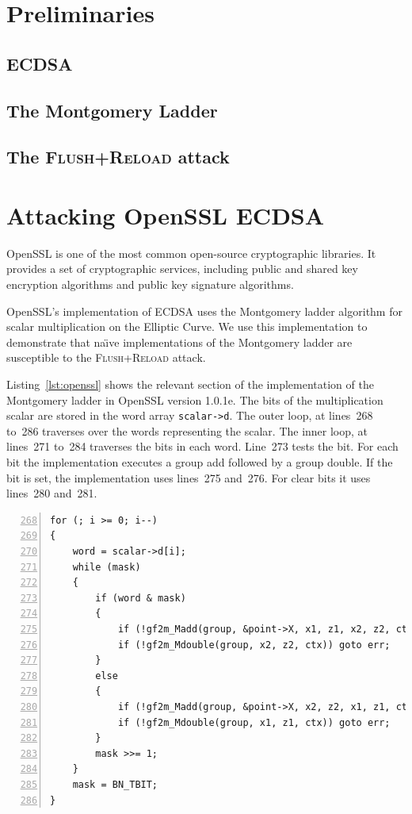 \documentclass{llncs}
\begin{document}
\section{Preliminaries}
\subsection{ECDSA}
\subsection{The Montgomery Ladder}
\subsection{The \textsc{Flush+Reload} attack}
\section{Attacking OpenSSL ECDSA}
OpenSSL is one of the most common open-source cryptographic libraries.
It provides a set of cryptographic services, including public and shared key encryption 
algorithms and public key signature algorithms.

OpenSSL's implementation of ECDSA uses the Montgomery ladder algorithm for scalar multiplication
on the Elliptic Curve.
We use this implementation to demonstrate that na{\"\i}ve implementations of the Montgomery ladder are
susceptible to the \textsc{Flush+Reload} attack.

Listing~\ref{lst:openssl} shows the relevant section of the implementation of the Montgomery ladder in OpenSSL version 1.0.1e.
The bits of the multiplication scalar are stored in the word array \texttt{scalar->d}.
The outer loop, at lines~268 to~286 traverses over the words representing the scalar.
The inner loop, at lines~271 to~284 traverses the bits in each word.
Line~273 tests the bit. 
For each bit the implementation executes a group add followed by a group double.
If the bit is set, the implementation uses lines~275 and~276.
For clear bits it uses lines~280 and~281.

\begin{lstlisting}[numbers=left,firstnumber=268,float=htb,caption=OpenSSL Implementation of the Montgomery Ladder,label=lst:openssl]
for (; i >= 0; i--)
{
    word = scalar->d[i];
    while (mask)
    {
        if (word & mask)
        {
            if (!gf2m_Madd(group, &point->X, x1, z1, x2, z2, ctx)) goto err;
            if (!gf2m_Mdouble(group, x2, z2, ctx)) goto err;
        }
        else
        {
            if (!gf2m_Madd(group, &point->X, x2, z2, x1, z1, ctx)) goto err;
            if (!gf2m_Mdouble(group, x1, z1, ctx)) goto err;
        }
        mask >>= 1;
    }
    mask = BN_TBIT;
}
\end{lstlisting}
\end{document}
